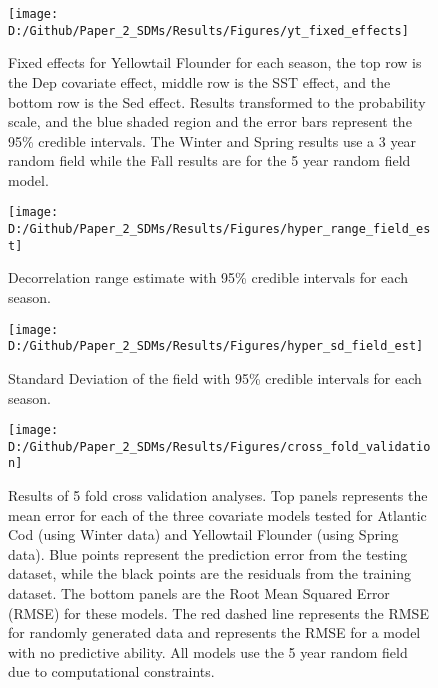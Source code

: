 \documentclass[
]{article}
\begin{document}
\begin{landscape}
\newpage
\begin{figure}
\texttt{[image: D:/Github/Paper\_2\_SDMs/Results/Figures/yt\_fixed\_effects]} \caption{Fixed effects for Yellowtail Flounder for each season, the top row is the Dep covariate effect, middle row is the SST effect, and the bottom row is the Sed effect. Results transformed to the probability scale, and the blue shaded region and the error bars represent the 95\% credible intervals. The Winter and Spring results use a 3 year random field while the Fall results are for the 5 year random field model.}\label{fig:yt-fe}
\end{figure}

\clearpage

\begin{figure}
\texttt{[image: D:/Github/Paper\_2\_SDMs/Results/Figures/hyper\_range\_field\_est]} \caption{Decorrelation range estimate with 95\% credible intervals for each season.}\label{fig:hyper-range-var-est}
\end{figure}

\clearpage

\begin{figure}
\texttt{[image: D:/Github/Paper\_2\_SDMs/Results/Figures/hyper\_sd\_field\_est]} \caption{Standard Deviation of the field with 95\% credible intervals for each season.}\label{fig:hyper-sd-var-est}
\end{figure}

\newpage
\begin{figure}
\texttt{[image: D:/Github/Paper\_2\_SDMs/Results/Figures/cross\_fold\_validation]} \caption{Results of 5 fold cross validation analyses. Top panels represents the mean error for each of the three covariate models tested for Atlantic Cod (using Winter data) and Yellowtail Flounder (using Spring data). Blue points represent the prediction error from the testing dataset, while the black points are the residuals from the training dataset. The bottom panels are the Root Mean Squared Error (RMSE) for these models.  The red dashed line represents the RMSE for randomly generated data and represents the RMSE for a model with no predictive ability. All models use the 5 year random field due to computational constraints.}\label{fig:folds}
\end{figure}


\end{landscape}
\end{document}
